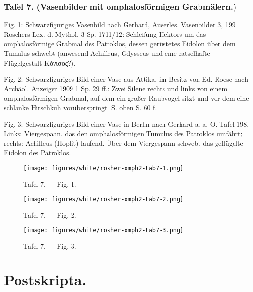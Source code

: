 \documentclass[a4paper, 11pt, oneside]{article}
\begin{document}
\subsubsection{Tafel 7. (Vasenbilder mit omphalosförmigen Grabmälern.)}

Fig. 1: Schwarzfiguriges Vasenbild nach Gerhard, Auserles. Vasenbilder 3, 199 = Roschers Lex. d. Mythol. 3 Sp. 1711/12: Schleifung Hektors um das omphalosförmige Grabmal des Patroklos, dessen gerüstetes Eidolon über dem Tumulus schwebt (anwesend Achilleus, Odysseus und eine rätselhafte Flügelgestalt Κόνισος?).

Fig. 2: Schwarzfiguriges Bild einer Vase aus Attika, im Besitz von Ed. Roese nach Archäol. Anzeiger 1909 1 Sp. 29 ff.: Zwei Silene rechts und links von einem omphalosförmigen Grabmal, auf dem ein großer Raubvogel sitzt und vor dem eine schlanke Hirschkuh vorüberspringt. S. oben S. 60 f.

Fig. 3: Schwarzfiguriges Bild einer Vase in Berlin nach Gerhard a. a. O. Tafel 198. Links: Viergespann, das den omphalosförmigen Tumulus des Patroklos umfährt; rechts: Achilleus (Hoplit) laufend. Über dem Viergespann schwebt das geflügelte Eidolon des Patroklos.
\clearpage
\begin{landscape}
\vspace*{\fill}
\begin{figure}[H]
\centering
\texttt{[image: figures/white/rosher-omph2-tab7-1.png]}
\caption{Tafel 7. --- Fig. 1.}
\end{figure}
\vspace*{\fill}
\clearpage
\vspace*{\fill}
\begin{figure}[H]
\centering
\texttt{[image: figures/white/rosher-omph2-tab7-2.png]}
\caption{Tafel 7. --- Fig. 2.}
\end{figure}
\vspace*{\fill}
\clearpage
\vspace*{\fill}
\begin{figure}[H]
\centering
\texttt{[image: figures/white/rosher-omph2-tab7-3.png]}
\caption{Tafel 7. --- Fig. 3.}
\end{figure}
\vspace*{\fill}
\clearpage
\end{landscape}
\section{Postskripta.}
\end{document}
